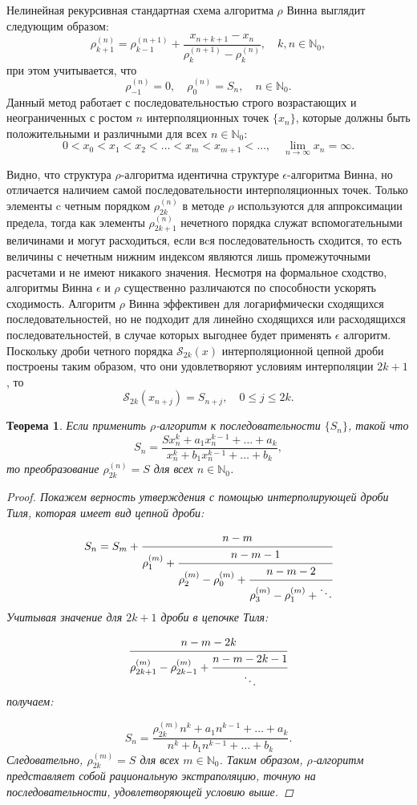 \documentclass[14pt, a4paper]{extarticle}
\newtheorem{theorem}{Теорема}[section] %
\theoremstyle{definition}
\theoremstyle{remark}
\begin{document}
Нелинейная рекурсивная стандартная схема алгоритма \emph{$\rho$} Винна выглядит следующим образом:
\[
\rho_{k+1}^{(n)} = \rho_{k-1}^{(n+1)} + \frac{x_{n+k+1} - x_n}{\rho_{k}^{(n+1)} - \rho_{k}^{(n)}}, \quad k,n \in \mathbb{N}_{0},
\]
при этом учитывается, что 
\[
\rho_{-1}^{(n)} = 0, \quad \rho_0^{(n)} = S_n, \quad n \in \mathbb{N}_{0}.
\]
Данный метод работает с последовательностью строго возрастающих и неограниченных с ростом \(n\) интерполяционных точек \(\{x_n\}\), которые должны быть положительными и различными для всех \(n \in \mathbb{N}_{0}\):
\[
0 < x_0 < x_1 < x_2 < \ldots < x_m < x_{m+1} < \ldots, \quad \lim_{n \to \infty} x_n = \infty.
\]

Видно, что структура $\rho$-алгоритма идентична структуре $\epsilon$-алгоритма
Винна, но отличается наличием самой последовательности интерполяционных
точек. Только элементы c четным порядком \(\rho_{2k}^{(n)}\) в методе
\emph{$\rho$} используются для аппроксимации предела, тогда как элементы
\(\rho_{2k + 1}^{(n)}\) нечетного порядка служат вспомогательными
величинами и могут расходиться, если вcя последовательность сходится, то
есть величины с нечетным нижним индексом являются лишь промежуточными
расчетами и не имеют никакого значения.
Несмотря на формальное сходство, алгоритмы Винна \(\epsilon\) и \emph{$\rho$}
существенно различаются по способности ускорять сходимость. Алгоритм
\emph{$\rho$} Винна эффективен для логарифмически сходящихся
последовательностей, но не подходит для линейно сходящихся или
расходящихся последовательностей, в случае которых выгоднее будет
применять \(\epsilon\) алгоритм.
Поскольку дроби четного порядка \(\mathcal{S}_{2k}(x)\) интерполяционной цепной дроби построены таким образом, что они удовлетворяют условиям
интерполяции \(2k + 1\), то
\[
\mathcal{S}_{2k}\left(x_{n+j}\right) = S_{n+j}, \quad 0 \leq j \leq 2k. 
\]


\begin{theorem}
Если применить \emph{$\rho$}-алгоритм к последовательности \(\{S_n\}\), такой что
\[
S_n = \frac{S x_n^k + a_1 x_n^{k-1} + \dots + a_k}{x_n^k + b_1 x_n^{k-1} + \dots + b_k},
\]
то преобразование \(\rho_{2k}^{(n)} = S\) для всех \(n \in \mathbb{N}_0\).

\begin{proof}
Покажем верность утверждения с помощью интерполирующей дроби Тиля, которая имеет вид цепной дроби:

\[
S_n = S_m + \cfrac{n-m}{\rho_1^{(m)} + \cfrac{n-m-1}{\rho_2^{(m)} - \rho_0^{(m)} + \cfrac{n-m-2}{\rho_3^{(m)} - \rho_1^{(m)} + \ddots}}}
\]
Учитывая значение для \(2k+1\) дроби в цепочке Тиля:

\[
\cfrac{n-m-2k}{\rho_{2k+1}^{(m)} - \rho_{2k-1}^{(m)} + \cfrac{n-m-2k-1}{\ddots}}
\]
получаем:

\[
S_n = \frac{\rho_{2k}^{(m)} n^k + a_1 n^{k-1} + \dots + a_k}{n^k + b_1 n^{k-1} + \dots + b_k}.
\]
Следовательно, \(\rho_{2k}^{(m)} = S\) для всех \(m \in \mathbb{N}_0\). Таким образом, \(\rho\)-алгоритм представляет собой рациональную экстраполяцию, точную на последовательности, удовлетворяющей условию выше.
\end{proof}
\end{theorem}
\end{document}
